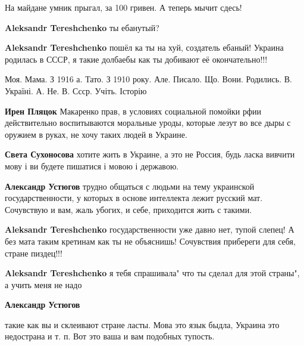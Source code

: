\begin{itemize}
\begin{itemize}
На майдане умник прыгал, за 100 гривен. А теперь мычит сдесь!


\textbf{Aleksandr Tereshchenko} ты ебанутый?


\textbf{Aleksandr Tereshchenko} пошёл ка ты на хуй, создатель ебаный! Украина родилась в СССР, я такие долбаебы как ты добивают её окончательно!!!


Моя. Мама. З 1916 а. Тато. З 1910 року. Але. Писало. Що. Вони. Родились. В. Україні. А. Не. В. Ссср. Учіть. Історію


\textbf{Ирен Пляцок} Макаренко прав, в условиях социальной помойки рфии
действительно воспитываются моральные уроды, которые лезут во все дыры с
оружием в руках, не хочу таких людей в Украине.

\textbf{Света Сухоносова} хотите жить в Украине, а это не Россия, будь ласка
вивчити мову і ви будете пишатися і мовою і державою.



\textbf{Александр Устюгов} трудно общаться с людьми на тему украинской
государственности, у которых в основе интеллекта лежит русский мат. Сочувствую
и вам, жаль убогих, и себе, приходится жить с такими.


\textbf{Aleksandr Tereshchenko} государственности уже давно нет, тупой слепец!
А без мата таким кретинам как ты не объяснишь! Сочувствия прибереги для себя,
стране пиздец!!!

\textbf{Aleksandr Tereshchenko} я тебя спрашивала" что ты сделал для этой страны", а учить меня не надо


\textbf{Александр Устюгов} 

такие как вы и склеивают стране ласты. Мова это язык быдла, Украина это
недострана и т. п. Вот это ваша и вам подобных тупость.



\end{itemize}
\end{itemize}
